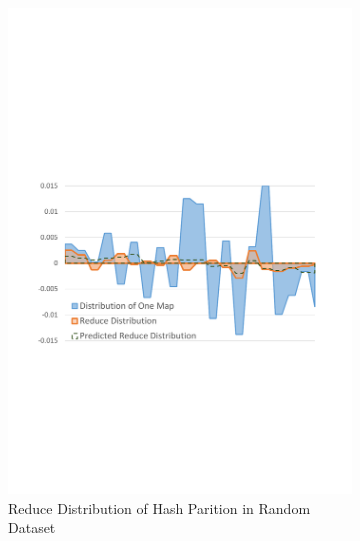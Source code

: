 \documentclass[10pt,twocolumn]{article}
\begin{document}
\begin{figure}
	\centering
	\begin{subfigure}[b]{0.32\linewidth}
		\includegraphics[width=\linewidth]{fig/hash_pre}
		\caption{Reduce Distribution of Hash Parition in Random Dataset}
		\label{fig:hash_pre}
	\end{subfigure}
	\begin{subfigure}[b]{0.32\linewidth}

\end{subfigure}
\end{figure}
\end{document}
